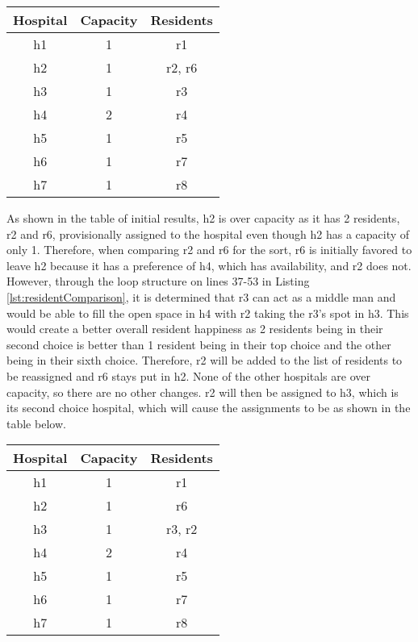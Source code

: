 \documentclass[letterpaper, 10pt,DIV=13]{scrartcl}
\numberwithin{equation}{section} %
\numberwithin{figure}{section} %
\numberwithin{table}{section} %
\begin{document}
\begin{center}
  \begin{tabular}{|c|c|c|}
    \hline
    Hospital & Capacity & Residents \\
    \hline
    h1 & 1 & r1 \\
    \hline
    h2 & 1 & r2, r6 \\
    \hline
    h3 & 1 & r3 \\
    \hline
    h4 & 2 & r4 \\
    \hline
    h5 & 1 & r5 \\
    \hline
    h6 & 1 & r7 \\
    \hline
    h7 & 1 & r8 \\
    \hline
  \end{tabular}
\end{center}

As shown in the table of initial results, h2 is over capacity as it has 2 residents, r2 and r6, provisionally assigned to the hospital even though h2 has a capacity of only 1. Therefore, when comparing r2 and r6 for the sort, r6 is initially favored to leave h2 because it has a preference of h4, which has availability, and r2 does not. However, through the loop structure on lines 37-53 in Listing \ref{lst:residentComparison}, it is determined that r3 can act as a middle man and would be able to fill the open space in h4 with r2 taking the r3's spot in h3. This would create a better overall resident happiness as 2 residents being in their second choice is better than 1 resident being in their top choice and the other being in their sixth choice. Therefore, r2 will be added to the list of residents to be reassigned and r6 stays put in h2. None of the other hospitals are over capacity, so there are no other changes. r2 will then be assigned to h3, which is its second choice hospital, which will cause the assignments to be as shown in the table below.

\begin{center}
  \begin{tabular}{|c|c|c|}
    \hline
    Hospital & Capacity & Residents \\
    \hline
    h1 & 1 & r1 \\
    \hline
    h2 & 1 & r6 \\
    \hline
    h3 & 1 & r3, r2 \\
    \hline
    h4 & 2 & r4 \\
    \hline
    h5 & 1 & r5 \\
    \hline
    h6 & 1 & r7 \\
    \hline
    h7 & 1 & r8 \\
    \hline
  \end{tabular}
\end{center}
\end{document}
